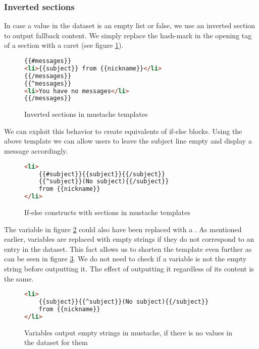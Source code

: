 \documentclass[thesis.tex]{subfiles}
\begin{document}
\subsubsection{Inverted sections}
In case a value in the dataset is an empty list or false, we use an inverted
section to output fallback content. We simply replace the hash-mark in the
opening tag of a section with a caret (see figure \ref{fig:inverted.mustache}).
\begin{figure}
	\centering
	\caption{Inverted sections in mustache templates}
	\label{fig:inverted.mustache}
	\begin{lstlisting}[language=HTML]
{{#messages}}
<li>{{subject}} from {{nickname}}</li>
{{/messages}}
{{^messages}}
<li>You have no messages</li>
{{/messages}}
	\end{lstlisting}
\end{figure}

We can exploit this behavior to create equivalents of if-else blocks.
Using the above template we can allow users to leave the subject line empty
and display a message accordingly.
\begin{figure}
	\centering
	\caption{If-else constructs with sections in mustache templates}
	\label{fig:ifelse.mustache}
	\begin{lstlisting}[language=HTML]
<li>
	{{#subject}}{{subject}}{{/subject}}
	{{^subject}}(No subject){{/subject}}
	from {{nickname}}
</li>
	\end{lstlisting}
\end{figure}

The  variable in figure \ref{fig:ifelse.mustache} could
also have been replaced with a .
As mentioned earlier, variables are replaced with empty strings if
they do not correspond to an entry in the dataset.
This fact allows us to shorten the template even further as can be seen in
figure \ref{fig:emptystr.mustache}.
We do not need to check if a variable is not the empty string before outputting
it. The effect of outputting it regardless of its content is the same.

\begin{figure}
	\centering
	\caption{Variables output empty strings in mustache, if there is no values in
	         the dataset for them}
	\label{fig:emptystr.mustache}
	\begin{lstlisting}[language=HTML]
<li>
	{{subject}}{{^subject}}(No subject){{/subject}}
	from {{nickname}}
</li>
	\end{lstlisting}
\end{figure}
\end{document}
